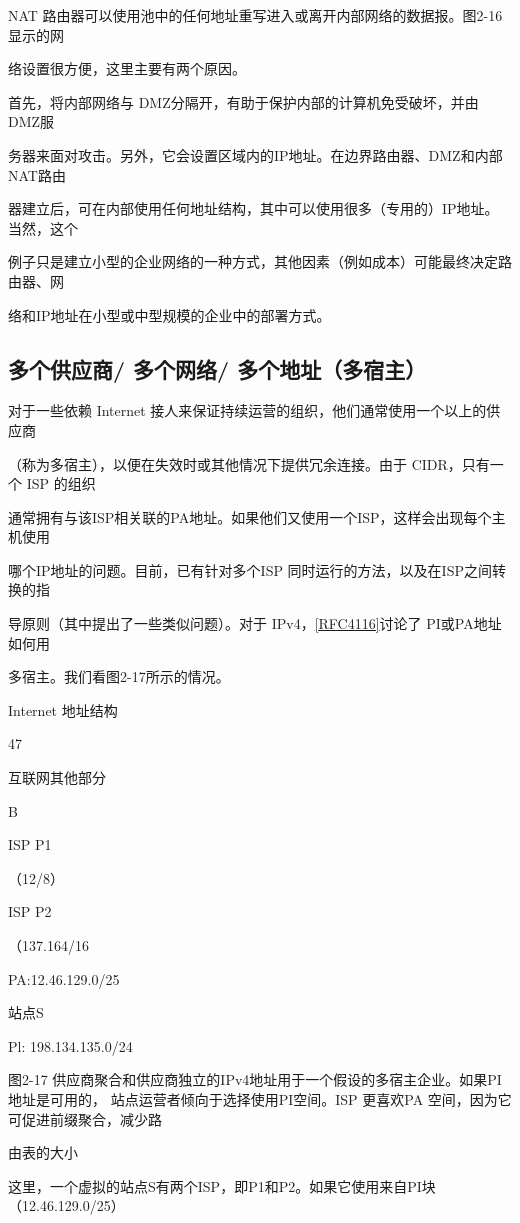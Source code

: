 NAT 路由器可以使用池中的任何地址重写进入或离开内部网络的数据报。图2-16显示的网

络设置很方便，这里主要有两个原因。

首先，将内部网络与 DMZ分隔开，有助于保护内部的计算机免受破坏，并由 DMZ服

务器来面对攻击。另外，它会设置区域内的IP地址。在边界路由器、DMZ和内部 NAT路由

器建立后，可在内部使用任何地址结构，其中可以使用很多（专用的）IP地址。当然，这个

例子只是建立小型的企业网络的一种方式，其他因素（例如成本）可能最终决定路由器、网

络和IP地址在小型或中型规模的企业中的部署方式。

\subsection{多个供应商/ 多个网络/ 多个地址（多宿主）}
对于一些依赖 Internet 接人来保证持续运营的组织，他们通常使用一个以上的供应商

（称为多宿主），以便在失效时或其他情况下提供冗余连接。由于 CIDR，只有一个 ISP 的组织

通常拥有与该ISP相关联的PA地址。如果他们又使用一个ISP，这样会出现每个主机使用

哪个IP地址的问题。目前，已有针对多个ISP 同时运行的方法，以及在ISP之间转换的指

导原则（其中提出了一些类似问题）。对于 IPv4，\href{https://www.rfc-editor.org/rfc/rfc4116}{[RFC4116]}讨论了 PI或PA地址如何用

多宿主。我们看图2-17所示的情况。

Internet 地址结构

47

互联网其他部分

B

ISP P1

（12/8）

ISP P2

（137.164/16

PA:12.46.129.0/25

站点S

Pl: 198.134.135.0/24

图2-17 供应商聚合和供应商独立的IPv4地址用于一个假设的多宿主企业。如果PI 地址是可用的，
站点运营者倾向于选择使用PI空间。ISP 更喜欢PA 空间，因为它可促进前缀聚合，减少路

由表的大小

这里，一个虚拟的站点S有两个ISP，即P1和P2。如果它使用来自PI块（12.46.129.0/25）

